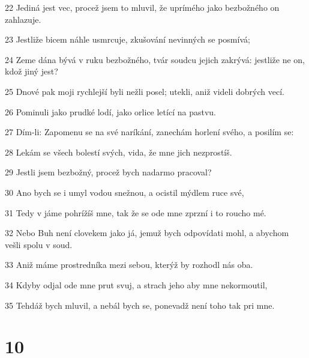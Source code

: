 \par 22 Jediná jest vec, procež jsem to mluvil, že uprímého jako bezbožného on zahlazuje.
\par 23 Jestliže bicem náhle usmrcuje, zkušování nevinných se posmívá;
\par 24 Zeme dána bývá v ruku bezbožného, tvár soudcu jejich zakrývá: jestliže ne on, kdož jiný jest?
\par 25 Dnové pak moji rychlejší byli nežli posel; utekli, aniž videli dobrých vecí.
\par 26 Pominuli jako prudké lodí, jako orlice letící na pastvu.
\par 27 Dím-li: Zapomenu se na své naríkání, zanechám horlení svého, a posilím se:
\par 28 Lekám se všech bolestí svých, vida, že mne jich nezprostíš.
\par 29 Jestli jsem bezbožný, procež bych nadarmo pracoval?
\par 30 Ano bych se i umyl vodou snežnou, a ocistil mýdlem ruce své,
\par 31 Tedy v jáme pohrížíš mne, tak že se ode mne zprzní i to roucho mé.
\par 32 Nebo Buh není clovekem jako já, jemuž bych odpovídati mohl, a abychom vešli spolu v soud.
\par 33 Aniž máme prostredníka mezi sebou, kterýž by rozhodl nás oba.
\par 34 Kdyby odjal ode mne prut svuj, a strach jeho aby mne nekormoutil,
\par 35 Tehdáž bych mluvil, a nebál bych se, ponevadž není toho tak pri mne.

\chapter{10}

